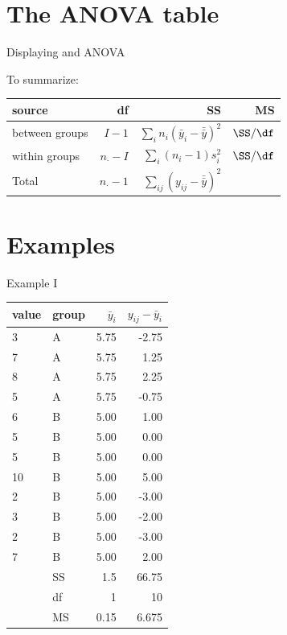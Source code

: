 \section{The ANOVA table}


\begin{frame}{Displaying and ANOVA}

  To summarize:
  \begin{center}
    \begin{tabular}{lrrr}
      source & df & SS & MS \\
      \hline
      between groups & $I-1$ & $\sum_i n_i (\bar y_i - \bar{\bar y})^2$  & $\SS/\df$ \\
      within groups & $n_\cdot -I$ & $\sum_i (n_i -1 )s_i^2$ & $\SS/\df$ \\
      \hline
      Total & $n_\cdot -1$  & $\sum_{ij} (y_{ij}-\bar{\bar y})^2$  & \\
    \end{tabular}
  \end{center}


\end{frame}


\section{Examples}


\begin{frame}{Example I}

\begin{tabular}{ll|rr}
  value & group & $\bar y_i$ & $y_{ij}-\bar y_i$  \\ 
  \hline
3   &  A  &  5.75  &  -2.75      \\
7   &  A  &  5.75  &  1.25       \\
8   &  A  &  5.75  &  2.25       \\
5   &  A  &  5.75  &  -0.75      \\
6   &  B  &  5.00     &  1.00          \\
5   &  B  &  5.00     &  0.00          \\
5   &  B  &  5.00     &  0.00          \\
10  &  B  &  5.00     &  5.00          \\
2   &  B  &  5.00     &  -3.00         \\
3   &  B  &  5.00     &  -2.00         \\
2   &  B  &  5.00     &  -3.00         \\
7   &  B  &  5.00     &  2.00        \\
   \hline
   & SS & 1.5 & 66.75 \\ 
   & df & 1 & 10 \\ 
   & MS & 0.15 & 6.675   \\ 
\end{tabular}

\end{frame}

